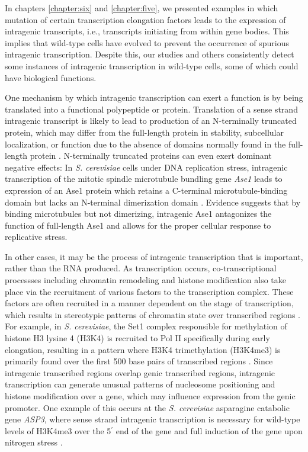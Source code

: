 In chapters \ref{chapter:six} and \ref{chapter:five}, we presented examples in which mutation of certain transcription elongation factors leads to the expression of intragenic transcripts, i.e., transcripts initiating from within gene bodies.
This implies that wild-type cells have evolved to prevent the occurrence of spurious intragenic transcription.
Despite this, our studies and others \citep{malabat2015, pelechano2013a} consistently detect some instances of intragenic transcription in wild-type cells, some of which could have biological functions.

One mechanism by which intragenic transcription can exert a function is by being translated into a functional polypeptide or protein.
Translation of a sense strand intragenic transcript is likely to lead to production of an N-terminally truncated protein, which may differ from the full-length protein in stability, subcellular localization, or function due to the absence of domains normally found in the full-length protein \citep{benanti2009, gammie1999, mcknight2014}.
N-terminally truncated proteins can even exert dominant negative effects: In \textit{S. cerevisiae} cells under DNA replication stress, intragenic transcription of the mitotic spindle microtubule bundling gene \textit{Ase1} leads to expression of an Ase1 protein which retains a C-terminal microtubule-binding domain but lacks an N-terminal dimerization domain \citep{mcknight2014}.
Evidence suggests that by binding microtubules but not dimerizing, intragenic Ase1 antagonizes the function of full-length Ase1 and allows for the proper cellular response to replicative stress.

In other cases, it may be the process of intragenic transcription that is important, rather than the RNA produced.
As transcription occurs, co-transcriptional processses including chromatin remodeling and histone modification also take place via the recruitment of various factors to the transcription complex.
These factors are often recruited in a manner dependent on the stage of transcription, which results in stereotypic patterns of chromatin state over transcribed regions \citep{smolle2013, buratowski2010}.
For example, in \textit{S. cerevisiae}, the Set1 complex responsible for methylation of histone H3 lysine 4 (H3K4) is recruited to Pol II specifically during early elongation, resulting in a pattern where H3K4 trimethylation (H3K4me3) is primarily found over the first 500 base pairs of transcribed regions \citep{soares2017}.
Since intragenic transcribed regions overlap genic transcribed regions, intragenic transcription can generate unusual patterns of nucleosome positioning and histone modification over a gene, which may influence expression from the genic promoter.
One example of this occurs at the \textit{S. cerevisiae} asparagine catabolic gene \textit{ASP3}, where sense strand intragenic transcription is necessary for wild-type levels of H3K4me3 over the 5$^\prime$ end of the gene and full induction of the gene upon nitrogen stress \citep{huang2010}.

